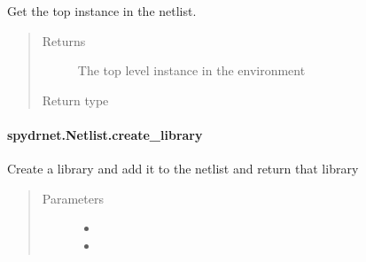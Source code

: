 \documentclass[letterpaper,10pt,english,openany,oneside]{sphinxmanual}
\begin{document}
\begin{fulllineitems}
\label{\detokenize{reference/classes/generated/spydrnet.Netlist.top_instance:spydrnet.Netlist.top_instance}}
Get the top instance in the netlist.
\begin{quote}\begin{description}
\item[{Returns}] \leavevmode
The top level instance in the environment

\item[{Return type}] \leavevmode
{\hyperref[\detokenize{reference/classes/instance:spydrnet.Instance}]{}}

\end{description}\end{quote}

\end{fulllineitems}



\paragraph{spydrnet.Netlist.create\_library}
\label{\detokenize{reference/classes/generated/spydrnet.Netlist.create_library:spydrnet-netlist-create-library}}\label{\detokenize{reference/classes/generated/spydrnet.Netlist.create_library::doc}}

\begin{fulllineitems}
\label{\detokenize{reference/classes/generated/spydrnet.Netlist.create_library:spydrnet.Netlist.create_library}}
Create a library and add it to the netlist and return that library
\begin{quote}\begin{description}
\item[{Parameters}] \leavevmode\begin{itemize}
\item {} 

\item {} 

\end{itemize}

\end{description}\end{quote}

\end{fulllineitems}
\end{document}
